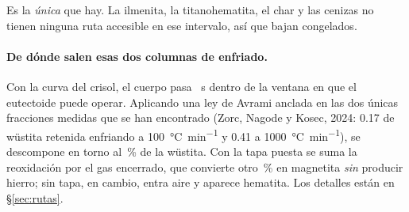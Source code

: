 \documentclass[11pt,a4paper]{article}
\begin{document}
Es la \emph{única} que hay. La ilmenita, la titanohematita, el char y las
cenizas no tienen ninguna ruta accesible en ese intervalo, así que bajan
congelados.

\begin{table}[H]
\centering\small

\caption{Composición \textbf{dentro de la mufla} en cada instante de
extracción: \% en masa sobre el sólido, con la masa total y la porosidad. Cada
fila suma 100. A partir de los \SI{150}{\second} no cambia nada más: se agotó el
reductor. Esto es lo que hay \emph{a \SI{900}{\celsius}}; lo que se saca y se
deja enfriar está en el cuadro~\ref{tab:enfriado}.}
\label{tab:fases-tiempo}
\end{table}

\begin{table}[H]
\centering
\resizebox{\textwidth}{!}{}
\caption{\textbf{Lo que se recupera ya frío}, en \% en masa. Cada fila responde
a «lo saqué a los $t$ segundos: ¿qué tengo?», y cada celda de las cinco últimas
columnas da los \textbf{tres estados en el mismo orden}:
\emph{en la mufla / con tapa / sin tapa}. El primero es el estado a
\SI{900}{\celsius} sin enfriar, y los otros dos son lo que queda al dejarlo
llegar a temperatura ambiente por cada camino. Las cuatro fases de la izquierda
salen iguales en los tres casos: no tienen ninguna transformación accesible
entre \SI{900}{\celsius} y el ambiente. La masa tampoco cambia al enfriar,
porque todo lo que ocurre son reorganizaciones en estado sólido.}
\label{tab:enfriado}
\end{table}

\paragraph{De dónde salen esas dos columnas de enfriado.} Con la curva del
crisol, el cuerpo pasa \datEnfriaVentana\ \si{\second} dentro de la ventana en
que el eutectoide puede operar. Aplicando una ley de Avrami anclada en las dos
únicas fracciones medidas que se han encontrado (Zorc, Nagode y Kosec, 2024:
\num{0.17} de wüstita retenida enfriando a \SI{100}{\celsius\per\minute} y
\num{0.41} a \SI{1000}{\celsius\per\minute}), se descompone en torno al
\datFraccionEutectoide\,\% de la wüstita. Con la tapa puesta se suma la
reoxidación por el gas encerrado, que convierte otro \datReoxidaGas\,\% en
magnetita \emph{sin} producir hierro; sin tapa, en cambio, entra aire y aparece
hematita. Los detalles están en \S\ref{sec:rutas}.
\end{document}

